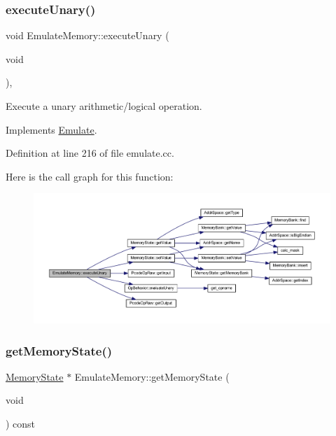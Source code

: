 \subsubsection{\texorpdfstring{executeUnary()}{executeUnary()}}
{\footnotesize\ttfamily void Emulate\+Memory\+::execute\+Unary (\begin{DoxyParamCaption}\item[{void}]{ }\end{DoxyParamCaption})\hspace{0.3cm}{\ttfamily [protected]}, {\ttfamily [virtual]}}



Execute a unary arithmetic/logical operation. 



Implements \mbox{\hyperlink{class_emulate_a95111238fb3061b23db2e94ec280b34f}{Emulate}}.



Definition at line 216 of file emulate.\+cc.

Here is the call graph for this function\+:
\nopagebreak
\begin{figure}[H]
\begin{center}
\leavevmode
\includegraphics[width=350pt]{class_emulate_memory_af31f9f35bb843b59d6a509bcbb045894_cgraph}
\end{center}
\end{figure}
\mbox{\label{class_emulate_memory_a1c5da535487d454ce9e09228bf52d8be}} 
\subsubsection{\texorpdfstring{getMemoryState()}{getMemoryState()}}
{\footnotesize\ttfamily \mbox{\hyperlink{class_memory_state}{Memory\+State}} $\ast$ Emulate\+Memory\+::get\+Memory\+State (\begin{DoxyParamCaption}\item[{void}]{ }\end{DoxyParamCaption}) const\hspace{0.3cm}{\ttfamily [inline]}}



